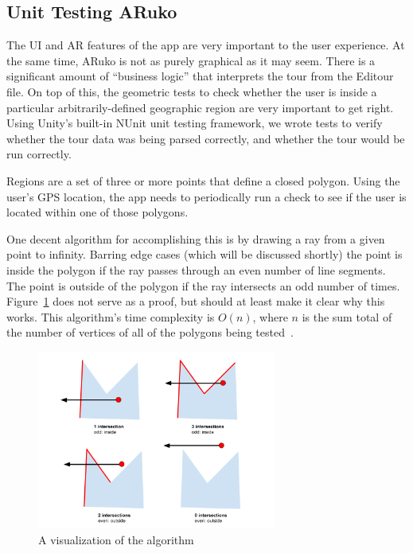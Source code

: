 \documentclass[a4paper, 10pt, american, titlepage]{article}
\begin{document}
\subsection{Unit Testing ARuko}
\label{sec:unitTestingARuko}

The UI and AR features of the app are very important to the user experience. At
the same time, ARuko is not as purely graphical as it may seem. There is a
significant amount of ``business logic'' that interprets the tour from the
Editour file. On top of this, the geometric tests to check whether the user is
inside a particular arbitrarily-defined geographic region are very important to
get right.  Using Unity's built-in NUnit unit testing framework, we wrote tests
to verify whether the tour data was being parsed correctly, and whether the tour
would be run correctly.

Regions are a set of three or more points that define a closed polygon. Using
the user's GPS location, the app needs to periodically run a check to see if the
user is located within one of those polygons.

One decent algorithm for accomplishing this is by drawing a ray from a given
point to infinity. Barring edge cases (which will be discussed shortly) the
point is inside the polygon if the ray passes through an even number of line
segments.  The point is outside of the polygon if the ray intersects an odd
number of times. Figure~\ref{fig:intersectionsDiagram} does not serve as a
proof, but should at least make it clear why this works. This algorithm's time
complexity is $O(n)$, where $n$ is the sum total of the number of vertices of
all of the polygons being tested~\autocite{geeksforgeekspolygon}.

\begin{figure}[h]
	\centering
	\includegraphics[width=0.7\textwidth]{intersections-diagram.png}
	\caption{A visualization of the algorithm}
	\label{fig:intersectionsDiagram}
\end{figure}
\end{document}
